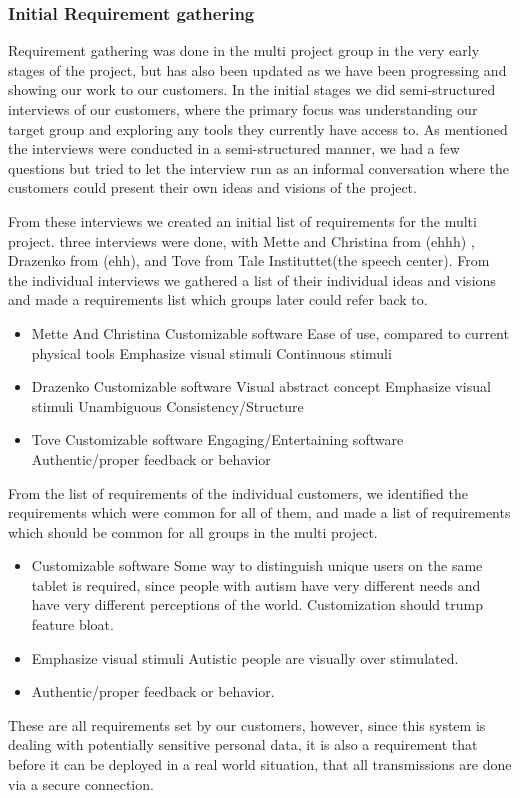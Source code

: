 \subsubsection{Initial Requirement gathering}
Requirement gathering was done in the multi project group in the very early stages of the project, but has also been updated as we have been progressing and showing our work to our customers.
In the initial stages we did semi-structured interviews of our customers, where the primary focus was understanding our target group and exploring any tools they currently have access to.
As mentioned the interviews were conducted in a semi-structured manner, we had a few questions%
but tried to let the interview run as an informal conversation where the customers could present their own ideas and visions of the project.

From these interviews we created an initial list of requirements for the multi project.
three interviews were done, with Mette and Christina from (ehhh) , Drazenko from (ehh), and Tove from Tale Instituttet(the speech center).
From the individual interviews we gathered a list of their individual ideas and visions and made a requirements list which groups later could refer back to.

\begin{itemize}
 \item Mette And Christina 
  \subitem Customizable software
  \subitem Ease of use, compared to current physical tools
  \subitem Emphasize visual stimuli
  \subitem Continuous stimuli 
 \item Drazenko
  \subitem Customizable software
  \subitem Visual abstract concept
  \subitem Emphasize visual stimuli
  \subitem Unambiguous
  \subitem Consistency/Structure
 \item Tove 
  \subitem Customizable software
  \subitem Engaging/Entertaining software
  \subitem Authentic/proper feedback or behavior
\end{itemize}

From the list of requirements of the individual customers, we identified the requirements which were common for all of them, and made a list of requirements which
should be common for all groups in the multi project.

\begin{itemize}
 \item Customizable software
  \subitem Some way to distinguish unique users on the same tablet is required, since people with autism have very different needs and have very different perceptions of the world.
  \subitem Customization should trump feature bloat.
 \item Emphasize visual stimuli
  \subitem Autistic people are visually over stimulated.
 \item Authentic/proper feedback or behavior.
\end{itemize}

These are all requirements set by our customers, however, since this system is dealing with potentially sensitive personal data, it is 
also a requirement that before it can be deployed in a real world situation, that all transmissions are done via a secure connection.	